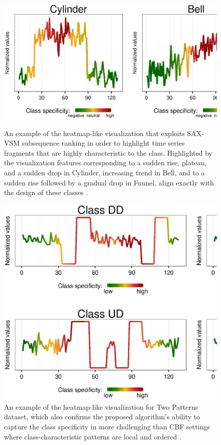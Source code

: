 \begin{figure}[!h]
   \centering
   \includegraphics[width=130mm]{figures/cbf-heatmap.ps}
   \caption{An example of the heatmap-like visualization that exploits SAX-VSM subsequence ranking in order to 
   highlight time series fragments that are highly characteristic to the class.
   Highlighted by the visualization features corresponding to a sudden rise, plateau, and a sudden drop in Cylinder, 
   increasing trend in Bell,
   and to a sudden rise followed by a gradual drop in Funnel, 
   align exactly with the design of these classes \cite{citeulike:12563781}.}
   \label{fig:heat1}
   \includegraphics[width=130mm]{figures/2patterns-heatmap.ps}
   \caption{An example of the heatmap-like visualization for Two Patterns dataset, which also confirms the proposed 
   algorithm's ability to capture the class specificity in more challenging than CBF settings where class-characteristic 
   patterns are local and ordered \cite{two_patterns}.}
   \label{fig:heat2}
\end{figure}

